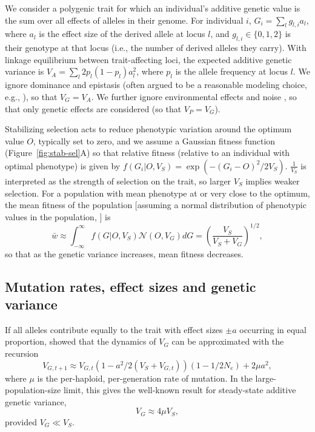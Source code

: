 \documentclass{article}
\begin{document}
We consider a polygenic trait for which an individual's additive genetic value
is the sum over all effects of alleles in their genome. For individual $i$,
\(G_i = \sum_l g_{l, i} a_l\), where $a_l$ is the effect size of the derived
allele at locus $l$, and \(g_{l,i}\in\{0,1,2\}\) is their genotype at that
locus (i.e., the number of derived alleles they carry). With linkage
equilibrium between trait-affecting loci, the expected additive genetic
variance is \(V_A = \sum_l 2p_l(1-p_l)a_l^2\), where $p_l$ is the allele
frequency at locus $l$. We ignore dominance and epistasis (often argued to be a
reasonable modeling choice, e.g., \citet{barton2002understanding,
zhang2002pleiotropic}), so that \(V_G = V_A\). We further ignore environmental
effects and noise \citep[under the assumption of additive environmental
effects, as in][]{lande1975maintenance, simons2018population}, so that only
genetic effects are considered (so that \(V_P=V_G\)).

Stabilizing selection acts to reduce phenotypic variation around the optimum
value $O$, typically set to zero, and we assume a Gaussian fitness function
(Figure~\ref{fig:stab-sel}A) so that relative fitness (relative to an
individual with optimal phenotype) is given by \(f(G_i | O,
V_S) = \exp{(-(G_i - O)^2 / 2 V_S)}\). $\frac{1}{V_S}$ is interpreted as the
strength of selection on the trait, so larger $V_S$ implies weaker selection.
For a population with mean phenotype at or very close to the optimum, the
mean fitness of the population [assuming a normal distribution of phenotypic
values in the population, \citep{turelli1994genetic, urban2013asymmetric}] is
\[\bar{w} \approx \int_{-\infty}^\infty
f(G | O, V_S) \mathcal{N}(O, V_G) dG =
\left(\frac{V_S}{V_S+V_G}\right)^{1/2},\]
so that as the genetic variance increases, mean fitness decreases.

\subsection*{Mutation rates, effect sizes and genetic variance}

If all alleles contribute equally to the trait
with effect sizes \(\pm a\) occurring in equal proportion,
\citet{keightley1988quantitative} showed that the dynamics of $V_G$ can be
approximated with the recursion
\[V_{G,t+1} \approx V_{G,t}\left(1-a^2/2(V_S+V_{G,t})\right)
\left(1-1/2N_e\right) + 2 \mu a^2,\]
where $\mu$ is the per-haploid, per-generation rate of mutation. In the
large-population-size limit, this gives the well-known result for
steady-state additive genetic variance,
\[V_G \approx 4\mu V_S,\] provided \(V_G \ll V_S\).
\end{document}
